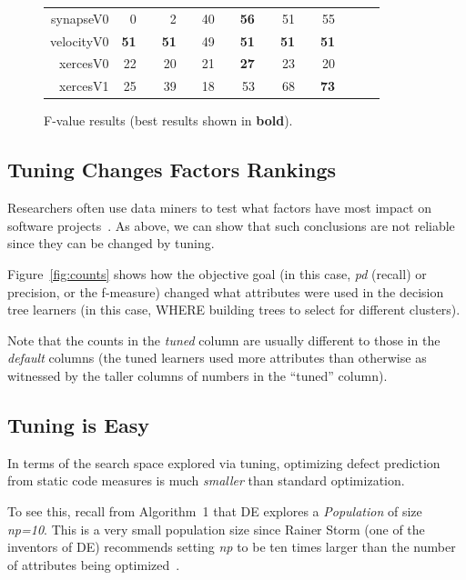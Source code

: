 \documentclass{sig-alternative}
\newcommand{\rone}{}
\newcommand{\rtwo}{}
\newcommand{\rthree}{}
\newcommand{\rfour}{}
\newcommand{\fig}[1]{Figure~\ref{fig:#1}}
\begin{document}
\begin{figure}[!t]
\begin{tabular}{r|rl|rl|rl|rl|rl|rlrl}
synapseV0 & 0 &         & 2 &         & 40 & {\rthree} & {\bf 56} & {\rfour} & 51 & {\rfour} & 55 & {\rfour}\\
velocityV0 & {\bf 51} & {\rfour} & {\bf 51} & {\rfour} & 49 &         & {\bf 51} & {\rfour} & {\bf 51} & {\rfour} & {\bf 51} & {\rfour}\\
xercesV0 & 22 & {\rone} & 20 &         & 21 &         & {\bf 27} & {\rfour} & 23 & {\rtwo} & 20 &        \\
xercesV1 & 25 &         & 39 & {\rone} & 18 &         & 53 & {\rthree} & 68 & {\rfour} & {\bf 73} & {\rfour}\\
\end{tabular}
\caption{F-value results (best results  shown in {\bf bold}).}
\label{fig:fbars}
\end{figure}


\subsection{Tuning Changes Factors Rankings }\label{sect:import}


Researchers often use data miners to  test what factors have most impact on software projects~\cite{bell2013limited,rahman2013how,me02k,moser2008comparative,zimmermann2007predicting,herzig2013predicting}. 
As above, we can show that such conclusions are not reliable since they can be changed by tuning.

\fig{counts} shows how the objective goal (in this case,
{\em pd} (recall) or precision, or the f-measure) changed what attributes were used
in the decision tree learners
(in this case, WHERE building trees to select for different clusters). 


Note that the counts in the {\em tuned} column are   usually
different to those in the {\em default} columns (the tuned learners used more attributes
than otherwise as witnessed by the taller columns of numbers in the ``tuned'' column).




\subsection{Tuning is Easy}\label{sect:easy}

In terms of the search space
explored via tuning, optimizing defect prediction from static code
measures is much {\em smaller} than standard optimization.

To see this,
recall from Algorithm~1 that
DE explores a {\em Population} of size {\em np=10}. This is a very small population size since
Rainer Storm (one of the inventors of DE) recommends  setting {\em np} to be ten times larger than the number
of attributes being optimized~\cite{storn1997differential}.
\end{document}
